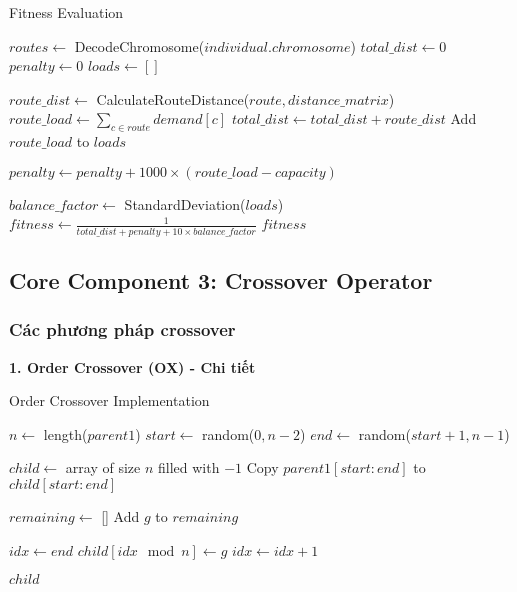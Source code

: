 \documentclass[12pt,a4paper]{article}
\begin{document}
\begin{algorithm}
\caption{Fitness Evaluation}
\begin{algorithmic}[1]
    \State $routes \gets$ DecodeChromosome($individual.chromosome$)
    \State $total\_dist \gets 0$
    \State $penalty \gets 0$
    \State $loads \gets []$
    
        \State $route\_dist \gets$ CalculateRouteDistance($route, distance\_matrix$)
        \State $route\_load \gets \sum_{c \in route} demand[c]$
        \State $total\_dist \gets total\_dist + route\_dist$
        \State Add $route\_load$ to $loads$
        
            \State $penalty \gets penalty + 1000 \times (route\_load - capacity)$
        \EndIf
    \EndFor
    
    \State $balance\_factor \gets$ StandardDeviation($loads$)
    \State $fitness \gets \frac{1}{total\_dist + penalty + 10 \times balance\_factor}$
    \State \Return $fitness$
\EndFunction
\end{algorithmic}
\end{algorithm}

\subsection{Core Component 3: Crossover Operator}

\subsubsection{Các phương pháp crossover}

\textbf{1. Order Crossover (OX) - Chi tiết}

\begin{algorithm}
\caption{Order Crossover Implementation}
\begin{algorithmic}[1]
    \State $n \gets$ length($parent1$)
    \State $start \gets$ random($0, n-2$)
    \State $end \gets$ random($start+1, n-1$)
    
    \State $child \gets$ array of size $n$ filled with $-1$
    \State Copy $parent1[start:end]$ to $child[start:end]$
    
    \State $remaining \gets$ []
            \State Add $g$ to $remaining$
        \EndIf
    \EndFor
    
    \State $idx \gets end$
        \State $child[idx \mod n] \gets g$
        \State $idx \gets idx + 1$
    \EndFor
    
    \State \Return $child$
\EndFunction
\end{algorithmic}
\end{algorithm}
\end{document}
